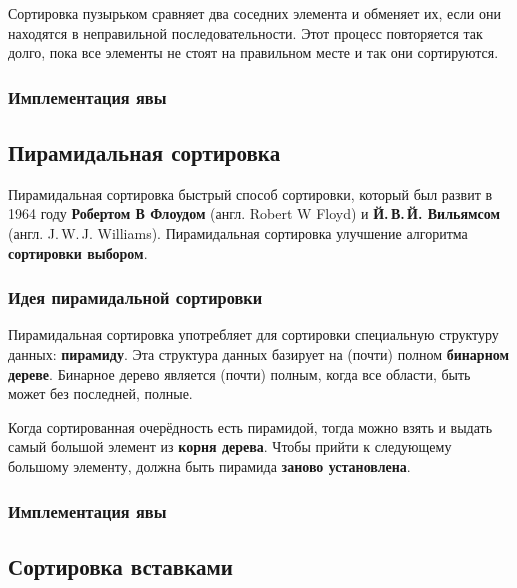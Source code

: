 \documentclass[11pt, a4paper, titlepage, twoside]{article}
\renewcommand{\emph}{\textbf}
\begin{document}
	Сортировка пузырьком сравняет два соседних элемента и обменяет их, если они находятся в неправильной последовательности. Этот процесс повторяется так долго, пока все элементы не стоят на правильном месте и так они сортируются.
	
	\subsubsection{Имплементация явы}
	
	
	
	\subsection{Пирамидальная сортировка}
	
	Пирамидальная сортировка быстрый способ сортировки, который был развит в 1964 году \emph{Робертом В Флоудом} (англ. Robert W Floyd) и \emph{Й.\,{}В.\,{}Й. Вильямсом} (англ. J.\,W.\,J. Williams). Пирамидальная сортировка улучшение алгоритма \emph{сортировки выбором}.
	
	\subsubsection{Идея пирамидальной сортировки}
	
	Пирамидальная сортировка употребляет для сортировки специальную структуру данных: \emph{пирамиду}. Эта структура данных базирует на (почти) полном \emph{бинарном дереве}. Бинарное дерево является (почти) полным, когда все области, быть может без последней, полные.
	
	Когда сортированная очерёдность есть пирамидой, тогда можно взять и выдать самый большой элемент из \emph{корня дерева}. Чтобы прийти к следующему большому элементу, должна быть пирамида \emph{заново установлена}.
	
	\subsubsection{Имплементация явы}
	
	
	
	\subsection{Сортировка вставками}
	
\end{document}
